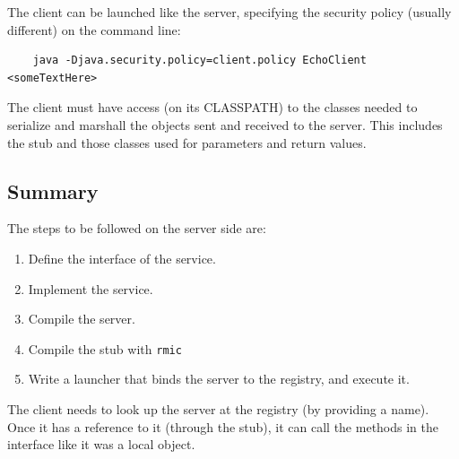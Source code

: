The client can be launched like the server, specifying the security
policy (usually different) on the command line: 

\begin{verbatim}
    java -Djava.security.policy=client.policy EchoClient <someTextHere>
\end{verbatim}

The client must have access (on its CLASSPATH) to the classes needed
to serialize and marshall the objects sent and received to the
server. This includes the stub and those classes used for parameters
and return values. 

\subsection{Summary}
\label{sec:summary}

The steps to be followed on the server side are: 

\begin{enumerate}
\item Define the interface of the service.
\item Implement the service.
\item Compile the server.
\item Compile the stub with \verb+rmic+
\item Write a launcher that binds the server to the registry, and
  execute it. 
\end{enumerate}

The client needs to look up the server at the registry (by providing a
name). Once it has a reference to it (through the stub), it can call
the methods in the interface like it was a local object. 

